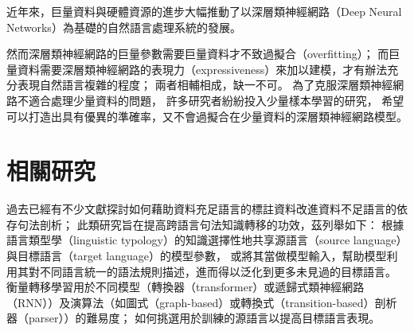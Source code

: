 近年來，巨量資料與硬體資源的進步大幅推動了以深層類神經網路（Deep Neural Networks）為基礎的自然語言處理系統的發展。
\iffalse
2012年，基於深層類神經網路的AlexNet模型在著名的圖片分類比賽ILSVRC（ImageNet Large Scale Visual Recognition Competition）
中大幅度贏過基於支撐向量機的第二名團隊，
也影響了自然語言處理的
2014年米氏（Tomas Mikolov）提出的文字向量（word2vec）\cite{Mikolov2013DistributedRO}
到2018年彼氏\cite{peters-etal-2018-deep}與戴氏\cite{devlin-etal-2019-bert}
先後提出的上下文化詞向量（contextualized word representations），
其訓練所使用的語料愈來愈龐雜，模型參數愈大，
於下游任務（downstream task）如詞性標注（part-of-speech tagging）、
句法剖析（syntactic parsing）、語意角色標注（semantic role labeling）、
問答系統（question answering）等的表現愈佳。
\fi
然而深層類神經網路的巨量參數需要巨量資料才不致過擬合（overfitting）；
而巨量資料需要深層類神經網路的表現力（expressiveness）來加以建模，才有辦法充分表現自然語言複雜的程度；
兩者相輔相成，缺一不可。
為了克服深層類神經網路不適合處理少量資料的問題，
許多研究者紛紛投入少量樣本學習的研究，
希望可以打造出具有優異的準確率，又不會過擬合在少量資料的深層類神經網路模型。

\section{相關研究}
過去已經有不少文獻探討如何藉助資料充足語言的標註資料改進資料不足語言的依存句法剖析\cite{zhang-barzilay-2015-hierarchical,agic-etal-2016-multilingual,rasooli-collins-2017-cross}；
此類研究旨在提高跨語言句法知識轉移的功效，茲列舉如下：
根據語言類型學（linguistic typology）的知識\cite{wals}選擇性地共享源語言（source language）與目標語言（target language）的模型參數\cite{naseem-etal-2012-selective}，
或將其當做模型輸入，幫助模型利用其對不同語言統一的語法規則描述，進而得以泛化到更多未見過的目標語言\cite{tackstrom-etal-2013-target,zhang-barzilay-2015-hierarchical,aufrant-etal-2016-zero,littell-etal-2017-uriel}。
衡量轉移學習用於不同模型（轉換器（transformer）或遞歸式類神經網路（RNN））及演算法（如圖式（graph-based）或轉換式（transition-based）剖析器（parser））的難易度\cite{ahmad-etal-2019-difficulties}；
如何挑選用於訓練的源語言以提高目標語言表現\cite{lin-etal-2019-choosing}。

